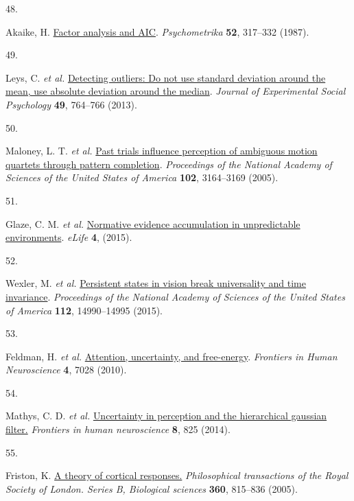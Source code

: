 \documentclass[
]{article}
\newlength{\cslhangindent}
\newlength{\csllabelwidth}
\newlength{\cslentryspacingunit} %
\newenvironment{CSLReferences}[2] %
 {%
  \setlength{\parindent}{0pt}
  \ifodd #1
  \let\oldpar\par
  \def\par{\hangindent=\cslhangindent\oldpar}
  \fi
  \setlength{\parskip}{#2\cslentryspacingunit}
 }%
 {}
\newcommand{\CSLLeftMargin}[1]{\parbox[t]{\csllabelwidth}{#1}}
\newcommand{\CSLRightInline}[1]{\parbox[t]{\linewidth - \csllabelwidth}{#1}\break}
\begin{document}
\begin{CSLReferences}{0}{0}
\leavevmode{}%
\CSLLeftMargin{48. }%
\CSLRightInline{Akaike, H.
\href{https://doi.org/10.1007/BF02294359}{Factor analysis and AIC}.
\emph{Psychometrika} \textbf{52}, 317--332 (1987).}

\leavevmode{}%
\CSLLeftMargin{49. }%
\CSLRightInline{Leys, C. \emph{et al.}
\href{https://doi.org/10.1016/J.JESP.2013.03.013}{Detecting outliers: Do
not use standard deviation around the mean, use absolute deviation
around the median}. \emph{Journal of Experimental Social Psychology}
\textbf{49}, 764--766 (2013).}

\leavevmode{}%
\CSLLeftMargin{50. }%
\CSLRightInline{Maloney, L. T. \emph{et al.}
\href{https://doi.org/10.1073/pnas.0407157102}{Past trials influence
perception of ambiguous motion quartets through pattern completion}.
\emph{Proceedings of the National Academy of Sciences of the United
States of America} \textbf{102}, 3164--3169 (2005).}

\leavevmode{}%
\CSLLeftMargin{51. }%
\CSLRightInline{Glaze, C. M. \emph{et al.}
\href{https://doi.org/10.7554/eLife.08825}{Normative evidence
accumulation in unpredictable environments}. \emph{eLife} \textbf{4},
(2015).}

\leavevmode{}%
\CSLLeftMargin{52. }%
\CSLRightInline{Wexler, M. \emph{et al.}
\href{https://doi.org/10.1073/pnas.1508847112}{Persistent states in
vision break universality and time invariance}. \emph{Proceedings of the
National Academy of Sciences of the United States of America}
\textbf{112}, 14990--14995 (2015).}

\leavevmode{}%
\CSLLeftMargin{53. }%
\CSLRightInline{Feldman, H. \emph{et al.}
\href{https://doi.org/10.3389/FNHUM.2010.00215/BIBTEX}{Attention,
uncertainty, and free-energy}. \emph{Frontiers in Human Neuroscience}
\textbf{4}, 7028 (2010).}

\leavevmode{}%
\CSLLeftMargin{54. }%
\CSLRightInline{Mathys, C. D. \emph{et al.}
\href{https://doi.org/10.3389/fnhum.2014.00825}{Uncertainty in
perception and the hierarchical gaussian filter.} \emph{Frontiers in
human neuroscience} \textbf{8}, 825 (2014).}

\leavevmode{}%
\CSLLeftMargin{55. }%
\CSLRightInline{Friston, K.
\href{https://doi.org/10.1098/rstb.2005.1622}{A theory of cortical
responses.} \emph{Philosophical transactions of the Royal Society of
London. Series B, Biological sciences} \textbf{360}, 815--836 (2005).}


\end{CSLReferences}
\end{document}
